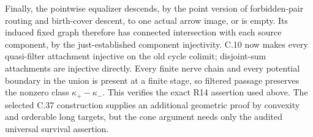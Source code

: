 Finally, the pointwise equalizer descends, by the point version of forbidden-pair routing and birth-cover descent, to one actual arrow image, or is empty. Its induced fixed graph therefore has connected intersection with each source component, by the just-established component injectivity. C.10 now makes every quasi-filter attachment injective on the old cycle colimit; disjoint-sum attachments are injective directly. Every finite nerve chain and every potential boundary in the union is present at a finite stage, so filtered passage preserves the nonzero class $\kappa_+-\kappa_-$. This verifies the exact R14 assertion used above. The selected C.37 construction supplies an additional geometric proof by convexity and orderable long targets, but the cone argument needs only the audited universal survival assertion.

